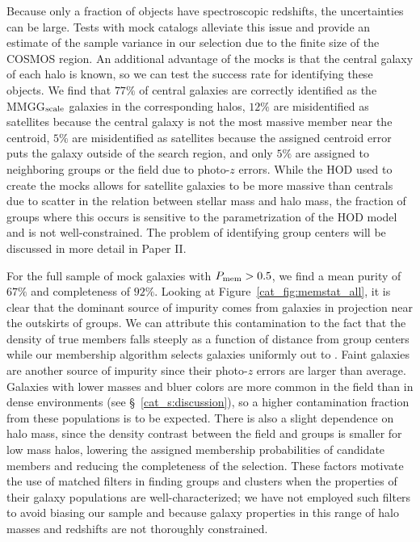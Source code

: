 Because only a fraction of objects have spectroscopic
redshifts, the uncertainties can be large. Tests with mock catalogs
alleviate this issue and provide an
estimate of the sample variance in our selection due to the finite
size of the COSMOS region. An additional advantage of the mocks is
that the central galaxy of  each halo is known, so we can test the
success rate for identifying these objects. We find that $77\%$ of
central galaxies are correctly identified as the MMGG$_{\rm scale}$
galaxies in the corresponding halos, $12\%$ are misidentified as
satellites because the central galaxy is not the most massive member
near the centroid, $5\%$ are misidentified as satellites because the
assigned centroid error puts the galaxy outside of the search region,
and only $5\%$ are assigned to neighboring groups or the field due to
photo-$z$ errors. While the HOD used to create the mocks allows for
satellite galaxies to be more massive than centrals due to scatter in
the relation between stellar mass and halo mass, the fraction of
groups where this occurs is sensitive to the parametrization of the
HOD model and is not well-constrained. The problem of identifying
group centers will be discussed in more detail in Paper II.

For the full sample of mock galaxies with $P_{\rm mem}>0.5$, we find a
mean purity of $67\%$ and completeness of $92\%$. Looking at
Figure~\ref{cat_fig:memstat_all}, it is clear that the dominant source of
impurity comes from galaxies in projection near the outskirts of
groups. We can attribute this contamination to the fact that the
density of true members falls steeply as a function of distance from
group centers while our membership algorithm selects galaxies
uniformly out to \rvir. Faint galaxies are another source of impurity since their
photo-$z$ errors are larger than average. Galaxies with lower masses and
bluer colors are more common in the field than in dense environments
(see \S~\ref{cat_s:discussion}), so a higher contamination fraction from
these populations is to be expected. There is also a slight dependence on halo 
mass, since the density contrast between the field and groups is
smaller for low mass halos, lowering the assigned membership
probabilities of candidate members and reducing the completeness of
the selection. These factors motivate the use of matched filters in
finding groups and clusters when the properties of their galaxy
populations are well-characterized; we have not employed such filters
to avoid biasing our sample and because galaxy properties in this
range of halo masses and redshifts are not thoroughly constrained.

